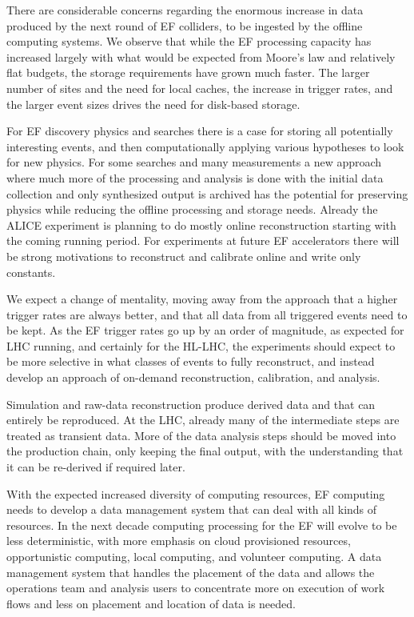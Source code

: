 There are considerable concerns regarding the enormous increase  in data
produced by the next round of EF colliders,   to be ingested by the offline
computing systems.  We observe that while the EF processing capacity has
increased largely with what would be expected from Moore's law and relatively
flat budgets, the storage requirements have grown much faster.  The larger
number of sites and the need for local caches, the increase in trigger rates,
and the larger event sizes drives the need for disk-based storage.

For EF discovery physics and searches there is a case for storing all
potentially interesting events, and then computationally  applying various
hypotheses to look for new physics.  For some searches and many measurements a
new approach where much more of the processing and analysis is done with the
initial data collection and only synthesized output is archived has the
potential for preserving physics while reducing the offline processing and
storage needs.  Already the ALICE experiment is planning to do mostly online
reconstruction starting with  the coming running period.   For experiments at
future EF accelerators there will be strong motivations to reconstruct and
calibrate online and write only constants.

We expect a change of mentality, moving away from the approach  that a higher
trigger rates are always better, and that all data from  all triggered events
need to be kept.   As the EF trigger rates go up by an order of magnitude,  as
expected for LHC running, and certainly for the HL-LHC,  the experiments
should expect to be more selective in what classes of events to fully
reconstruct,  and instead develop an approach of on-demand reconstruction,
calibration, and analysis.

Simulation and raw-data reconstruction produce  derived data and that can
entirely be reproduced. At the LHC, already many of the intermediate steps are
treated as transient data.   More of the data analysis steps should be moved
into the production chain, only keeping the final output, with the
understanding that it can be re-derived if required later.

With the expected increased diversity of computing resources, EF computing
needs to develop a data management system that can deal with all kinds of
resources.   In the next decade computing processing for the EF will evolve to
be less deterministic, with more emphasis on cloud provisioned resources,
opportunistic computing, local computing, and volunteer computing.   A data
management system that handles the placement of the data and allows the
operations team and analysis users to concentrate more on execution of work
flows and less on placement and location of data is needed.

